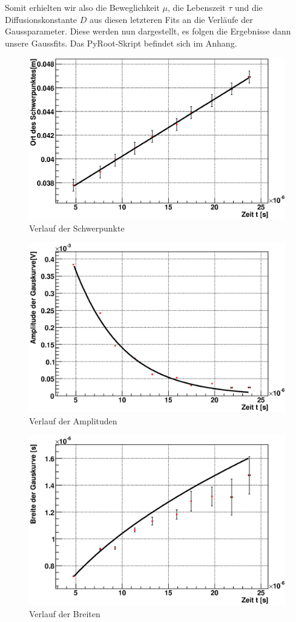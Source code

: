 \documentclass[12pt]{article}
\begin{document}
Somit erhielten wir also die Beweglichkeit $\mu$, die Lebenszeit $\tau$ und die Diffusionskonstante $D$ aus diesen letzteren Fits an die Verläufe der Gaussparameter. Diese werden nun dargestellt, es folgen die Ergebnisse dann unsere Gaussfits. Das PyRoot-Skript befindet sich im Anhang.


\begin{figure}[H]  
\includegraphics[width=0.9\linewidth]{pictures/varDist/schwerpunkt.eps}
\caption{Verlauf der Schwerpunkte}
\end{figure}

\begin{figure}[H]  
\includegraphics[width=0.9\linewidth]{pictures/varDist/amplitude.eps}
\caption{Verlauf der Amplituden}
\end{figure}

\begin{figure}[H]  
\includegraphics[width=0.9\linewidth]{pictures/varDist/sigma.eps}
\caption{Verlauf der Breiten}
\end{figure}
\end{document}
